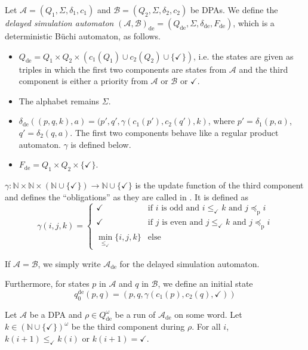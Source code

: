 \begin{defn}
	Let $\mathcal{A} = (Q_1, \Sigma, \delta_1, c_1)$ and $\mathcal{B} = (Q_2, \Sigma, \delta_2, c_2)$ be DPAs. We define the \emph{delayed simulation automaton} $(\mathcal{A},\mathcal{B})_\text{de} = (Q_\text{de}, \Sigma, \delta_\text{de}, F_\text{de})$, which is a deterministic Büchi automaton, as follows.
	
	\begin{itemize}
		\item $Q_\text{de} = Q_1 \times Q_2 \times (c_1(Q_1) \cup c_2(Q_2) \cup \{ \checkmark \})$, i.e. the states are given as triples in which the first two components are states from $\mathcal{A}$ and the third component is either a priority from $\mathcal{A}$ or $\mathcal{B}$ or $\checkmark$.
		\item The alphabet remains $\Sigma$.
		\item $\delta_\text{de}( (p, q, k), a ) = ( p', q', \gamma(c_1(p'), c_2(q'), k)$, where $p' = \delta_1(p, a)$, $q' = \delta_2(q, a)$. The first two components behave like a regular product automaton. $\gamma$ is defined below.
		\item $F_\text{de} = Q_1 \times Q_2 \times \{ \checkmark \}$.
	\end{itemize}
	
	$\gamma : \mathbb{N} \times \mathbb{N} \times (\mathbb{N} \cup \{\checkmark\}) \rightarrow \mathbb{N} \cup \{\checkmark\}$ is the update function of the third component and defines the \enquote{obligations} as they are called in \cite{FritzWilke06}. It is defined as 
	$$ \gamma(i, j, k) = \begin{cases}
		\checkmark & \text{if } i \text{ is odd and } i \leq_\checkmark k \text{ and } j \preceq_\text{p} i \\
		\checkmark & \text{if } j \text{ is even and } j \leq_\checkmark k \text{ and } j \preceq_\text{p} i \\
		\min_{\leq_\checkmark} \{ i,j,k \} & \text{else}
	\end{cases} $$
	
	If $\mathcal{A} = \mathcal{B}$, we simply write $\mathcal{A}_\text{de}$ for the delayed simulation automaton.
	
	Furthermore, for states $p$ in $\mathcal{A}$ and $q$ in $\mathcal{B}$, we define an initial state $$q_0^\text{de}(p, q) = (p, q, \gamma(c_1(p), c_2(q), \checkmark))$$
\end{defn}

\begin{lem}
\label{lem:fritzwilke:k_shrink}
	Let $\mathcal{A}$ be a DPA and $\rho \in Q_\text{de}^\omega$ be a run of $\mathcal{A}_\text{de}$ on some word. Let $k \in (\mathbb{N} \cup \{\checkmark\})^\omega$ be the third component during $\rho$. For all $i$, $k(i+1) \leq_\checkmark k(i)$ or $k(i+1) = \checkmark$.
\end{lem}

